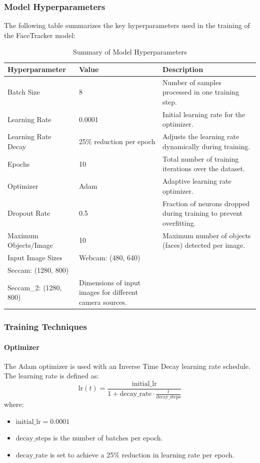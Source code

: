 \subsubsection{Model Hyperparameters}

The following table summarizes the key hyperparameters used in the training of the FaceTracker model:

\begin{table}[ht!]
    \centering
    \caption{Summary of Model Hyperparameters}
    \label{tab:model-hyperparameters}
    \begin{tabular}{|l|l|p{8cm}|}
        \hline
        \textbf{Hyperparameter} & \textbf{Value} & \textbf{Description} \\
        \hline
        Batch Size & 8 & Number of samples processed in one training step. \\
        Learning Rate & 0.0001 & Initial learning rate for the optimizer. \\
        Learning Rate Decay & 25\% reduction per epoch & Adjusts the learning rate dynamically during training. \\
        Epochs & 10 & Total number of training iterations over the dataset. \\
        Optimizer & Adam & Adaptive learning rate optimizer. \\
        Dropout Rate & 0.5 & Fraction of neurons dropped during training to prevent overfitting. \\
        Maximum Objects/Image & 10 & Maximum number of objects (faces) detected per image. \\
        Input Image Sizes & Webcam: (480, 640) \\ Seccam: (1280, 800) \\ Seccam\_2: (1280, 800) & Dimensions of input images for different camera sources. \\
        \hline
    \end{tabular}
\end{table}

\subsubsection{Training Techniques}

\paragraph{Optimizer}
The Adam optimizer is used with an Inverse Time Decay learning rate schedule. The learning rate is defined as:
\[
\text{lr}(t) = \frac{\text{initial\_lr}}{1 + \text{decay\_rate} \cdot \frac{t}{\text{decay\_steps}}}
\]
where:
\begin{itemize}
    \item \(\text{initial\_lr} = 0.0001\)
    \item \(\text{decay\_steps}\) is the number of batches per epoch.
    \item \(\text{decay\_rate}\) is set to achieve a 25\% reduction in learning rate per epoch.
\end{itemize}

